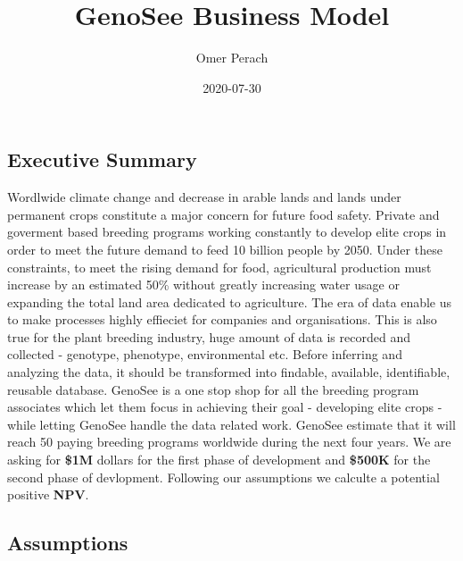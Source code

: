 \documentclass[
]{article}
\title{GenoSee Business Model}
\author{Omer Perach}
\date{2020-07-30}
\begin{document}
\maketitle

\hypertarget{executive-summary}{%
\subsection{Executive Summary}\label{executive-summary}}

Wordlwide climate change and decrease in arable lands and lands under
permanent crops constitute a major concern for future food safety.
Private and goverment based breeding programs working constantly to
develop elite crops in order to meet the future demand to feed 10
billion people by 2050. Under these constraints, to meet the rising
demand for food, agricultural production must increase by an estimated
50\% without greatly increasing water usage or expanding the total land
area dedicated to agriculture. The era of data enable us to make
processes highly effieciet for companies and organisations. This is also
true for the plant breeding industry, huge amount of data is recorded
and collected - genotype, phenotype, environmental etc. Before inferring
and analyzing the data, it should be transformed into findable,
available, identifiable, reusable database. GenoSee is a one stop shop
for all the breeding program associates which let them focus in
achieving their goal - developing elite crops - while letting GenoSee
handle the data related work. GenoSee estimate that it will reach 50
paying breeding programs worldwide during the next four years. We are
asking for \textbf{\$1M} dollars for the first phase of development and
\textbf{\$500K} for the second phase of devlopment. Following our
assumptions we calculte a potential positive \textbf{NPV}.

\hypertarget{assumptions}{%
\subsection{Assumptions}\label{assumptions}}
\end{document}
